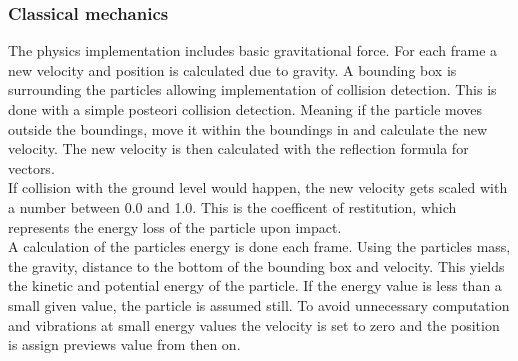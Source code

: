 \documentclass[report]{vgtc}
\begin{document}
\subsubsection{Classical mechanics}
The physics implementation includes basic gravitational force. For each frame a new velocity and position is calculated due to gravity. 
A bounding box is surrounding the particles allowing implementation of collision detection. This is done with a simple posteori collision detection. Meaning if the particle moves outside the boundings, move it within the boundings in and calculate the new velocity. The new velocity is then calculated with the reflection formula for vectors.\\
If collision with the ground level would happen, the new velocity gets scaled with a number between 0.0 and 1.0. This is the coefficent of restitution, which represents the energy loss of the particle upon impact.\\
A calculation of the particles energy is done each frame. Using the particles mass, the gravity, distance to the bottom of the bounding box and velocity. This yields the kinetic and potential energy of the particle. If the energy value is less than a small given value, the particle is assumed still. To avoid unnecessary computation and vibrations at small energy values the velocity is set to zero and the position is assign previews value from then on.
\end{document}
